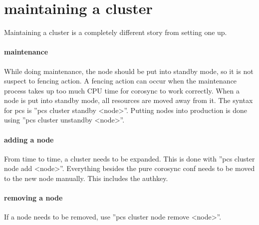 \section{maintaining a cluster}
Maintaining a cluster is a completely different story from setting one up.
\paragraph{maintenance}
While doing maintenance, the node should be put into standby mode, so it is not suspect
to fencing action. A fencing action can occur when the maintenance process
takes up too much CPU time for corosync to work correctly.
When a node is put into standby mode, all resources are moved away from it.
The syntax for pcs is ''pcs cluster standby <node>''. Putting nodes
into production is done using ''pcs cluster unstandby <node>''.
\paragraph{adding a node}
From time to time, a cluster needs to be expanded.
This is done with ''pcs cluster node add <node>''.
Everything besides the pure corosync conf needs to be moved to the new
node manually. This includes the authkey.
\paragraph{removing a node}
If a node needs to be removed, use ''pcs cluster node remove <node>''.
